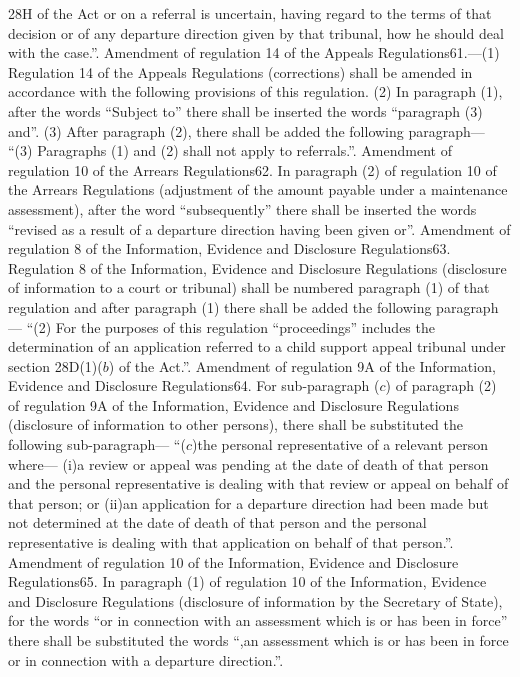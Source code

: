 \documentclass[a4paper]{article}
\begin{document}
28H of the Act or on a referral is uncertain, having regard to the terms of that
decision or of any departure direction given by that tribunal, how he should
deal with the case.”.
Amendment of regulation 14 of the Appeals Regulations61.—(1) Regulation 14 of
the Appeals Regulations (corrections) shall be amended in accordance with the
following provisions of this regulation.
(2) In paragraph (1), after the words “Subject to” there shall be inserted the
words “paragraph (3) and”.
(3) After paragraph (2), there shall be added the following paragraph—
“(3) Paragraphs (1) and (2) shall not apply to referrals.”.
Amendment of regulation 10 of the Arrears Regulations62. In paragraph (2) of
regulation 10 of the Arrears Regulations (adjustment of the amount payable under
a maintenance assessment), after the word “subsequently” there shall be inserted
the words “revised as a result of a departure direction having been given or”.
Amendment of regulation 8 of the Information, Evidence and Disclosure
Regulations63. Regulation 8 of the Information, Evidence and Disclosure
Regulations (disclosure of information to a court or tribunal) shall be numbered
paragraph (1) of that regulation and after paragraph (1) there shall be added
the following paragraph—
“(2) For the purposes of this regulation “proceedings” includes the
determination of an application referred to a child support appeal tribunal
under section 28D(1)($b$) of the Act.”.
Amendment of regulation 9A of the Information, Evidence and Disclosure
Regulations64. For sub-paragraph ($c$) of paragraph (2) of regulation 9A of the
Information, Evidence and Disclosure Regulations (disclosure of information to
other persons), there shall be substituted the following sub-paragraph—
“($c$)the personal representative of a relevant person where—
(i)a review or appeal was pending at the date of death of that person and the
personal representative is dealing with that review or appeal on behalf of that
person; or
(ii)an application for a departure direction had been made but not determined at
the date of death of that person and the personal representative is dealing with
that application on behalf of that person.”.
Amendment of regulation 10 of the Information, Evidence and Disclosure
Regulations65. In paragraph (1) of regulation 10 of the Information, Evidence
and Disclosure Regulations (disclosure of information by the Secretary of
State), for the words “or in connection with an assessment which is or has been
in force” there shall be substituted the words “,an assessment which is or has
been in force or in connection with a departure direction.”.
\end{document}
